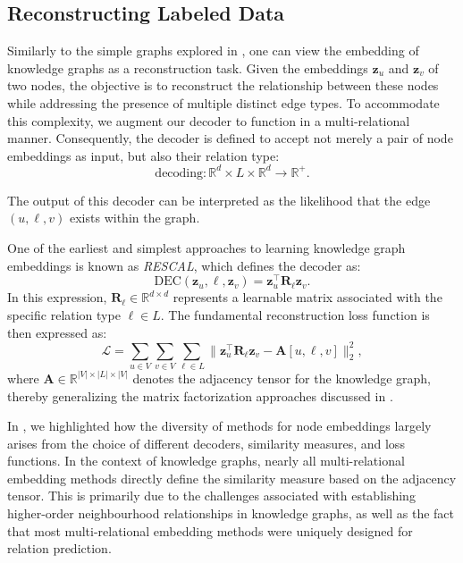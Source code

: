 \subsection{Reconstructing Labeled Data}
Similarly to the simple graphs explored in , one can view the embedding of knowledge graphs as a reconstruction task. Given the embeddings $ \mathbf{z}_u $ and $ \mathbf{z}_v $ of two nodes, the objective is to reconstruct the relationship between these nodes while addressing the presence of multiple distinct edge types. To accommodate this complexity, we augment our decoder to function in a multi-relational manner. Consequently, the decoder is defined to accept not merely a pair of node embeddings as input, but also their relation type:
\begin{equation*}
    \text{decoding}: \mathbb{R}^d \times L \times \mathbb{R}^d \to \mathbb{R}^+.
\end{equation*}

The output of this decoder can be interpreted as the likelihood that the edge $ (u,\ell,v) $ exists within the graph.

One of the earliest and simplest approaches to learning knowledge graph embeddings is known as \textit{RESCAL}, which defines the decoder as:
\begin{equation}\label{eq:RESCAL}
    \text{DEC}(\mathbf{z}_u, \ell, \mathbf{z}_v) = \mathbf{z}_u^\top \mathbf{R}_\ell \mathbf{z}_v.
\end{equation}
In this expression, $ \mathbf{R}_\ell\in \mathbb{R}^{d\times d} $ represents a learnable matrix associated with the specific relation type $ \ell\in L $. The fundamental reconstruction loss function is then expressed as:
\begin{equation}\label{eq:reconstructionLossMulti}
    \mathcal{L} = \sum_{u\in V}\sum_{v\in V}\sum_{\ell\in L} \|\mathbf{z}_u^\top \mathbf{R}_\ell \mathbf{z}_v - \mathbf{A}[u,\ell,v]\|_2^2,
\end{equation}
where $ \mathbf{A}\in\mathbb{R}^{|V|\times|L|\times|V|} $ denotes the adjacency tensor for the knowledge graph, thereby generalizing the matrix factorization approaches discussed in .

\medskip
In , we highlighted how the diversity of methods for node embeddings largely arises from the choice of different decoders, similarity measures, and loss functions. In the context of knowledge graphs, nearly all multi-relational embedding methods directly define the similarity measure based on the adjacency tensor. This is primarily due to the challenges associated with establishing higher-order neighbourhood relationships in knowledge graphs, as well as the fact that most multi-relational embedding methods were uniquely designed for relation prediction.

